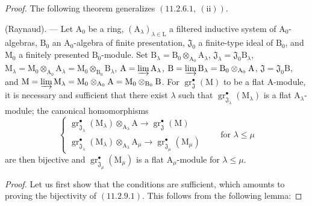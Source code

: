 \begin{proof}
The following theorem generalizes $(11.2.6.1,~(\mathrm{ii}))$.

\begin{theorem}[11.2.9]
\label{IV.11.2.9}
(Raynaud). --- Let $\mathrm{A}_0$ be a ring, $(\mathrm{A}_\lambda)_{\lambda\in\mathrm{L}}$ a filtered inductive system of $\mathrm{A}_0$-algebras, $\mathrm{B}_0$ an $\mathrm{A}_0$-algebra of finite presentation, $\mathfrak{J}_0$ a finite-type ideal of $\mathrm{B}_0$, and $\mathrm{M}_0$ a finitely presented $\mathrm{B}_0$-module. Set $\mathrm{B}_\lambda=\mathrm{B}_0\otimes_{\mathrm{A}_0}\mathrm{A}_\lambda$, $\mathfrak{J}_\lambda=\mathfrak{J}_0\mathrm{B}_\lambda$, $\mathrm{M}_\lambda=\mathrm{M}_0\otimes_{\mathrm{A}_0}\mathrm{A}_\lambda=\mathrm{M}_0\otimes_{\mathrm{B}_0}\mathrm{B}_\lambda$, $\mathrm{A}=\varinjlim\mathrm{A}_\lambda$, $\mathrm{B}=\varinjlim\mathrm{B}_\lambda=\mathrm{B}_0\otimes_{\mathrm{A}_0}\mathrm{A}$, $\mathfrak{J}=\mathfrak{J}_0\mathrm{B}$, and $\mathrm{M}=\varinjlim\mathrm{M}_\lambda=\mathrm{M}_0\otimes_{\mathrm{A}_0}\mathrm{A}=\mathrm{M}_0\otimes_{\mathrm{B}_0}\mathrm{B}$. For $\operatorname{gr}^\bullet_\mathfrak{J}(\mathrm{M})$ to be a flat $\mathrm{A}$-module, it is necessary and sufficient that there exist $\lambda$ such that $\operatorname{gr}^\bullet_{\mathfrak{J}_\lambda}(\mathrm{M}_\lambda)$ is a flat $\mathrm{A}_\lambda$-module; the canonical homomorphisms
\begin{equation}
  \begin{cases}
    \operatorname{gr}^\bullet_{\mathfrak{J}_\lambda}(\mathrm{M}_\lambda)\otimes_{\mathrm{A}_\lambda}\mathrm{A} \to \operatorname{gr}^\bullet_\mathfrak{J}(\mathrm{M}) \\
    \operatorname{gr}^\bullet_{\mathfrak{J}_\lambda}(\mathrm{M}_\lambda)\otimes_{\mathrm{A}_\lambda}\mathrm{A}_\mu \to \operatorname{gr}^\bullet_{\mathfrak{J}_\mu}(\mathrm{M}_\mu)
  \end{cases}
  \qquad\text{for }\lambda\leqslant\mu
  \label{IV.11.2.9.1}
\tag{11.2.9.1}
\end{equation}
are then bijective and $\operatorname{gr}^\bullet_{\mathfrak{J}_\mu}(\mathrm{M}_\mu)$ is a flat $\mathrm{A}_\mu$-module for $\lambda\leqslant\mu$.
\end{theorem}

\medskip
\noindent\emph{Proof.}
Let us first show that the conditions are sufficient, which amounts to proving
the bijectivity of $(11.2.9.1)$. This follows from the following lemma:


\end{proof}
